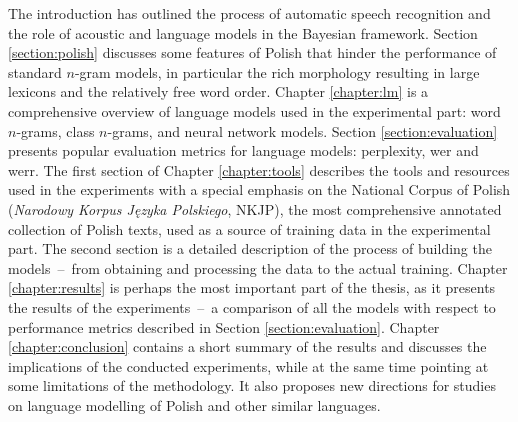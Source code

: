 The introduction has outlined the process of automatic speech recognition and the role of acoustic and language models in the Bayesian framework. Section \ref{section:polish} discusses some features of Polish that hinder the performance of standard \mbox{$n$-gram} models, in particular the rich morphology resulting in large lexicons and the relatively free word order. 
Chapter \ref{chapter:lm} is a comprehensive overview of language models used in the experimental part: word \mbox{$n$-grams}, class \mbox{$n$-grams}, and neural network models. Section \ref{section:evaluation} presents popular evaluation metrics for language models: perplexity, \gls{wer} and \gls{werr}. The first section of Chapter \ref{chapter:tools} describes the tools and resources used in the experiments with a special emphasis on the National Corpus of Polish (\textit{Narodowy Korpus Języka Polskiego}, NKJP), the most comprehensive annotated collection of Polish texts, used as a source of training data in the experimental part. The second section is a detailed description of the process of building the models~--~from obtaining and processing the data to the actual training. Chapter \ref{chapter:results} is perhaps the most important part of the thesis, as it presents the results of the experiments~--~a comparison of all the models with respect to performance metrics described in Section \ref{section:evaluation}. Chapter \ref{chapter:conclusion} contains a short summary of the results and discusses the implications of the conducted experiments, while at the same time pointing at some limitations of the methodology. It also proposes new directions for studies on language modelling of Polish and other similar languages.
